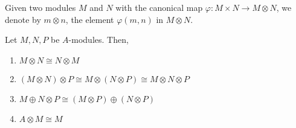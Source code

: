 Given two modules $M$ and $N$ with the canonical map $\varphi: M\times N\to M\otimes N$, we denote by $m\otimes n$, the element $\varphi(m,n)$ in $M\otimes N$.

\begin{proposition}
    Let $M, N, P$ be $A$-modules. Then, 
    \begin{enumerate}[label=(\alph*)]
    \item $M\otimes N\cong N\otimes M$ 
    \item $(M\otimes N)\otimes P\cong M\otimes(N\otimes P)\cong M\otimes N\otimes P$ 
    \item $M\oplus N\otimes P\cong(M\otimes P)\oplus(N\otimes P)$ 
    \item $A\otimes M\cong M$
    \end{enumerate}
\end{proposition}

